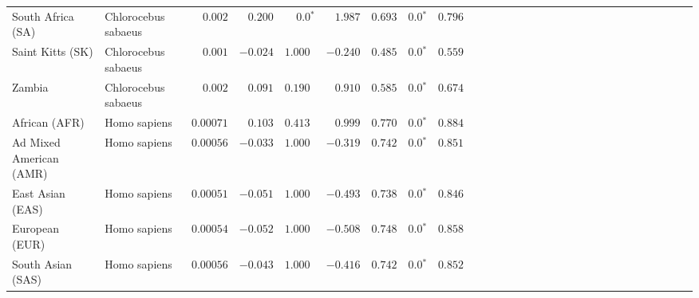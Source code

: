 \begin{center}
\begin{adjustbox}{width = 1\textwidth}
\begin{tabular}{|l|l|r|r|r|r|r|r|r|r|r|r|r|r|r|r|r|r|r|r|r|r|r|r|r|r|r|r|r|}
              South Africa (SA) &  Chlorocebus sabaeus &           $ 0.002$ &                      $ 0.200$ &                  $\bm{0.0{^*}}$ &                                           $ 1.987$ &                      $ 0.693$ &                  $\bm{0.0{^*}}$ &                                           $ 0.796$ \\
               Saint Kitts (SK) &  Chlorocebus sabaeus &           $ 0.001$ &                      $-0.024$ &                      $ 1.000~~$ &                                           $-0.240$ &                      $ 0.485$ &                  $\bm{0.0{^*}}$ &                                           $ 0.559$ \\
                         Zambia &  Chlorocebus sabaeus &           $ 0.002$ &                      $ 0.091$ &                      $ 0.190~~$ &                                           $ 0.910$ &                      $ 0.585$ &                  $\bm{0.0{^*}}$ &                                           $ 0.674$ \\
                  African (AFR) &         Homo sapiens &          $0.00071$ &                      $ 0.103$ &                      $ 0.413~~$ &                                           $ 0.999$ &                      $ 0.770$ &                  $\bm{0.0{^*}}$ &                                           $ 0.884$ \\
        Ad Mixed American (AMR) &         Homo sapiens &          $0.00056$ &                      $-0.033$ &                      $ 1.000~~$ &                                           $-0.319$ &                      $ 0.742$ &                  $\bm{0.0{^*}}$ &                                           $ 0.851$ \\
               East Asian (EAS) &         Homo sapiens &          $0.00051$ &                      $-0.051$ &                      $ 1.000~~$ &                                           $-0.493$ &                      $ 0.738$ &                  $\bm{0.0{^*}}$ &                                           $ 0.846$ \\
                 European (EUR) &         Homo sapiens &          $0.00054$ &                      $-0.052$ &                      $ 1.000~~$ &                                           $-0.508$ &                      $ 0.748$ &                  $\bm{0.0{^*}}$ &                                           $ 0.858$ \\
              South Asian (SAS) &         Homo sapiens &          $0.00056$ &                      $-0.043$ &                      $ 1.000~~$ &                                           $-0.416$ &                      $ 0.742$ &                  $\bm{0.0{^*}}$ &                                           $ 0.852$ \\
\bottomrule
\end{tabular}
\end{adjustbox}
\end{center}
\newpage
